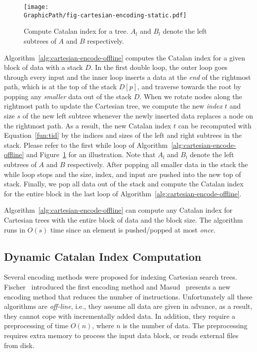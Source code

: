 

\begin{figure}[!thb]
  \centering
  \texttt{[image: \\GraphicPath/fig-cartesian-encoding-static.pdf]}
  \caption{Compute Catalan index for a tree.  $A_l$ and $B_l$ denote
    the left subtrees of $A$ and $B$ respectively.}
  \label{fig:fig-cartesian-encoding-static}
\end{figure}

Algorithm~\ref{alg:cartesian-encode-offline} computes the Catalan index
for a given block of data with a stack $D$.  In the first double loop,
the outer loop goes through every input and the inner loop inserts a
data at the {\em end} of the rightmost path, which is at the top of the
stack $D[p]$, and traverse towards the root by popping any {\em smaller}
data out of the stack $D$.  When we rotate nodes along the rightmost
path to update the Cartesian tree, we compute the new {\em index} $t$
and size $s$ of the new left subtree whenever the newly inserted data
replaces a node on the rightmost path.  As a result, the new Catalan
index $t$ can be recomputed with Equation~\ref{fun:tid} by the indices
and sizes of the left and right subtrees in the stack.  Please refer to
the first while loop of Algorithm~\ref{alg:cartesian-encode-offline} and
Figure~\ref{fig:fig-cartesian-encoding-static} for an illustration. Note
that $A_l$ and $B_l$ denote the left subtrees of $A$ and $B$
respectively.  After popping all smaller data in the stack the while
loop stops and the size, index, and input are pushed into the new top of
stack.  Finally, we pop all data out of the stack and compute the
Catalan index for the entire block in the last loop of
Algorithm~\ref{alg:cartesian-encode-offline}.

Algorithm~\ref{alg:cartesian-encode-offline} can compute any Catalan
index for Cartesian trees with the entire block of data and the block
size.  The algorithm runs in $O(s)$ time since an element is
pushed/popped at most {\em once}.

\subsection{Dynamic Catalan Index Computation} \label{sec:dynamic}

Several encoding methods were proposed for indexing Cartesian search
trees.  Fischer~\cite{Fischer2006TheoreticalAP} introduced the first
encoding method and Masud~\cite{Hasan2010CacheOA} presents a new
encoding method that reduces the number of instructions.
Unfortunately all these algorithms are {\em off-line}, i.e., they
assume all data are given in advance, as a result, they cannot cope
with incrementally added data.  In addition, they require a
preprocessing of time $O(n)$, where $n$ is the number of data.  The
preprocessing requires extra memory to process the input data block,
or reads external files from disk.

